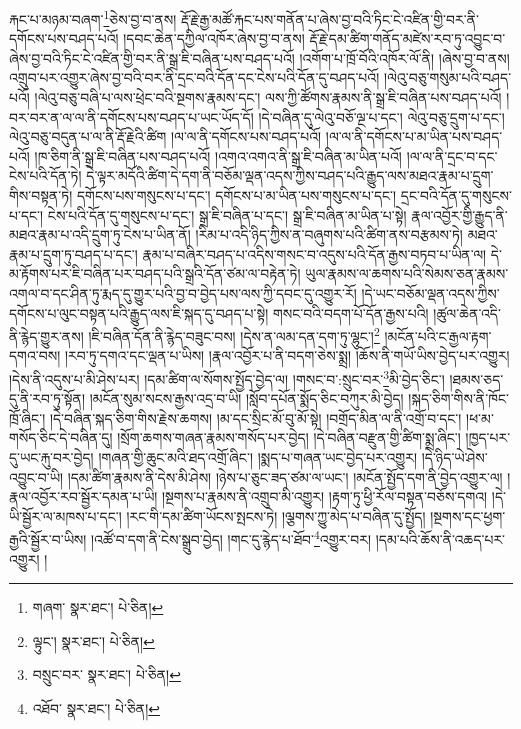 རྐང་པ་མཉམ་བཞག་\footnote{གཞག་  སྣར་ཐང་།  པེ་ཅིན། }ཅེས་བྱ་བ་ནས། རྡོ་རྗེ་རྒྱ་མཚོ་རྐང་པས་གནོན་པ་ཞེས་བྱ་བའི་ཏིང་ངེ་འཛིན་གྱི་བར་ནི་དགོངས་པས་བཤད་པའོ། །དབང་ཆེན་དཀྱིལ་འཁོར་ཞེས་བྱ་བ་ནས། རྡོ་རྗེ་དམ་ཚིག་གནོད་མཛེས་རབ་ཏུ་འབྱུང་བ་ཞེས་བྱ་བའི་ཏིང་ངེ་འཛིན་གྱི་བར་ནི་སྒྲ་ཇི་བཞིན་པས་བཤད་པའོ། །འགོག་པ་ཁྲོ་བོའི་འཁོར་ལོ་ནི། །ཞེས་བྱ་བ་ནས། འགྲུབ་པར་འགྱུར་ཞེས་བྱ་བའི་བར་ནི་དྲང་བའི་དོན་དང་ངེས་པའི་དོན་དུ་བཤད་པའོ། །ལེའུ་བཅུ་གསུམ་པའི་བཤད་པའོ། །ལེའུ་བཅུ་བཞི་པ་ལས་ཕྲེང་བའི་སྔགས་རྣམས་དང་། ལས་ཀྱི་ཚོགས་རྣམས་ནི་སྒྲ་ཇི་བཞིན་པས་བཤད་པའོ། །བར་བར་ན་ལ་ལ་ནི་དགོངས་པས་བཤད་པ་ཡང་ཡོད་དོ། །དེ་བཞིན་དུ་ལེའུ་བཅོ་ལྔ་པ་དང་། ལེའུ་བཅུ་དྲུག་པ་དང་། ལེའུ་བཅུ་བདུན་པ་ལ་ནི་རྡོ་རྗེའི་ཚིག །ལ་ལ་ནི་དགོངས་པས་བཤད་པའོ། །ལ་ལ་ནི་དགོངས་པ་མ་ཡིན་པས་བཤད་པའོ། །ཁ་ཅིག་ནི་སྒྲ་ཇི་བཞིན་པས་བཤད་པའོ། །འགའ་འགའ་ནི་སྒྲ་ཇི་བཞིན་མ་ཡིན་པའོ། །ལ་ལ་ནི་དྲང་བ་དང་ངེས་པའི་དོན་ཏེ། དེ་ལྟར་མདོའི་ཚིག་དེ་དག་ནི་བཅོམ་ལྡན་འདས་ཀྱིས་བཤད་པའི་རྒྱུད་ལས་མཐའ་རྣམ་པ་དྲུག་གིས་བསྟན་ཏེ། དགོངས་པས་གསུངས་པ་དང་། དགོངས་པ་མ་ཡིན་པས་གསུངས་པ་དང་། དྲང་བའི་དོན་དུ་གསུངས་པ་དང་། ངེས་པའི་དོན་དུ་གསུངས་པ་དང་། སྒྲ་ཇི་བཞིན་པ་དང་། སྒྲ་ཇི་བཞིན་མ་ཡིན་པ་སྟེ། རྣལ་འབྱོར་གྱི་རྒྱུད་ནི་མཐའ་རྣམ་པ་འདི་དྲུག་ཏུ་ངེས་པ་ཡིན་ནོ། །རིམ་པ་འདི་ཉིད་ཀྱིས་ན་བཞུགས་པའི་ཚིག་ནས་བརྩམས་ཏེ། མཐའ་རྣམ་པ་དྲུག་ཏུ་བཤད་པ་དང་། རྣམ་པ་བཞིར་བཤད་པ་འདིས་གསང་བ་འདུས་པའི་དོན་རྒྱས་བཏབ་པ་ཡིན་ལ། དེ་མ་རྟོགས་པར་ཇི་བཞིན་པར་བཤད་པའི་སྒྲའི་དོན་ཙམ་ལ་བརྟེན་ཏེ། ཡུལ་རྣམས་ལ་ཆགས་པའི་སེམས་ཅན་རྣམས་འགལ་བ་དང་ཤིན་ཏུ་རྨད་དུ་གྱུར་པའི་བྱ་བ་བྱེད་པས་ལས་ཀྱི་དབང་དུ་འགྱུར་རོ། །དེ་ཡང་བཅོམ་ལྡན་འདས་ཀྱིས་དགོངས་པ་ལུང་བསྟན་པའི་རྒྱུད་ལས་ཇི་སྐད་དུ་བཤད་པ་སྟེ། གསང་བའི་བདག་པོ་དོན་རྒྱས་པའི། །ཚུལ་ཆེན་འདི་ནི་རྙེད་གྱུར་ནས། །ཇི་བཞིན་དོན་ནི་རྙེད་བཟུང་བས། །དེས་ན་ལམ་དན་དག་ཏུ་ལྷུང་།\footnote{ལྟུང་།  སྣར་ཐང་།  པེ་ཅིན། } །མངོན་པའི་ང་རྒྱལ་རྟག་དགའ་བས། །རབ་ཏུ་དགའ་དང་ལྡན་པ་ཡིས། །རྣལ་འབྱོར་པ་ནི་བདག་ཅེས་སྨྲ། །ཆོས་ནི་གཡོ་ཡིས་བྱེད་པར་འགྱུར། །དེས་ནི་འདུས་པ་མི་ཤེས་པར། །དམ་ཚིག་ལ་སོགས་སྤྱོད་བྱེད་ལ། །གསང་བ་:སྲུང་བར་\footnote{བསྲུང་བར་  སྣར་ཐང་།  པེ་ཅིན། }མི་བྱེད་ཅིང་། །ཐམས་ཅད་དུ་ནི་རབ་ཏུ་སྟོན། །མངོན་སུམ་སངས་རྒྱས་འདྲ་བ་ཡི། །སློབ་དཔོན་སྨོད་ཅིང་བཀུར་མི་བྱེད། །སྐད་ཅིག་གིས་ནི་ཁོང་ཁྲོ་ཞིང་། །དེ་བཞིན་སྐད་ཅིག་གིས་རྗེས་ཆགས། །མ་དང་སྲིང་མོ་བུ་མོ་སྟེ། །བགྲོད་མིན་ལ་ནི་འགྲོ་བ་དང་། །ཕ་མ་གསོད་ཅིང་དེ་བཞིན་དུ། །སྲོག་ཆགས་གཞན་རྣམས་གསོད་པར་བྱེད། །དེ་བཞིན་བརྫུན་གྱི་ཚིག་སྨྲ་ཞིང་། །ཁྱད་པར་དུ་ཡང་རྐུ་བར་བྱེད། །གཞན་གྱི་ཆུང་མའི་ཐད་འགྲོ་ཞིང་། །སྨད་པ་གཞན་ཡང་བྱེད་པར་འགྱུར། །དེ་ཉིད་ཡེ་ཤེས་འབྱུང་བ་ཡི། །དམ་ཚིག་རྣམས་ནི་དེས་མི་ཤེས། །ཉེས་པ་ཅུང་ཟད་ཙམ་ལ་ཡང་། །མངོན་སྤྱོད་དག་ནི་བྱེད་འགྱུར་ལ། །རྣལ་འབྱོར་རབ་སྦྱོར་དམན་པ་ཡི། །སྔགས་པ་རྣམས་ནི་འགྲུབ་མི་འགྱུར། །རྟག་ཏུ་ཕྱི་རོལ་བསྟན་བཅོས་དགའ། །དེ་ཡི་སྦྱོར་ལ་མཁས་པ་དང་། །རང་གི་དམ་ཚིག་ཡོངས་སྤངས་ཏེ། །ལྕགས་ཀྱུ་མེད་པ་བཞིན་དུ་སྤྱོད། །སྔགས་དང་ཕྱག་རྒྱའི་སྦྱོར་བ་ཡིས། །འཚོ་བ་དག་ནི་ངེས་སྒྲུབ་བྱེད། །གང་དུ་རྙེད་པ་ཐོབ་\footnote{འཐོབ་  སྣར་ཐང་།  པེ་ཅིན། }འགྱུར་བར། །དམ་པའི་ཆོས་ནི་འཆད་པར་འགྱུར། །
